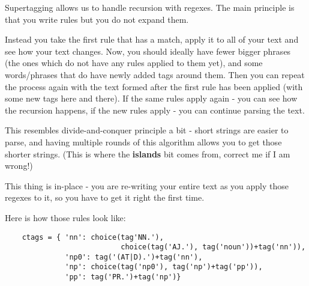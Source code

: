 

%

Supertagging allows us to handle recursion with regexes. The main principle is
that you write rules but you do not expand them.

Instead you take the first rule that has a match, apply it to all of your text
and see how your text changes. Now, you should ideally have fewer bigger phrases
(the ones which do not have any rules applied to them yet), and some
words/phrases that do have newly added tags around them. Then you can repeat the
process again with the text formed after the first rule has been applied (with
some new tags here and there). If the same rules apply again - you can see how
the recursion happens, if the new rules apply - you can continue parsing the
text.

This resembles divide-and-conquer principle a bit - short strings are easier to
parse, and having multiple rounds of this algorithm allows you to get those
shorter strings. (This is where the \textbf{islands} bit comes from, correct me
if I am wrong!)

This thing is in-place - you are re-writing your entire text as you apply those
regexes to it, so you have to get it right the first time.

Here is how those rules look like:

\begin{verbatim}
	ctags = { 'nn': choice(tag'NN.'),
						   choice(tag('AJ.'), tag('noun'))+tag('nn')),
		      'np0': tag('(AT|D).')+tag('nn'),
	          'np': choice(tag('np0'), tag('np')+tag('pp')),
	          'pp': tag('PR.')+tag('np')}
\end{verbatim}

